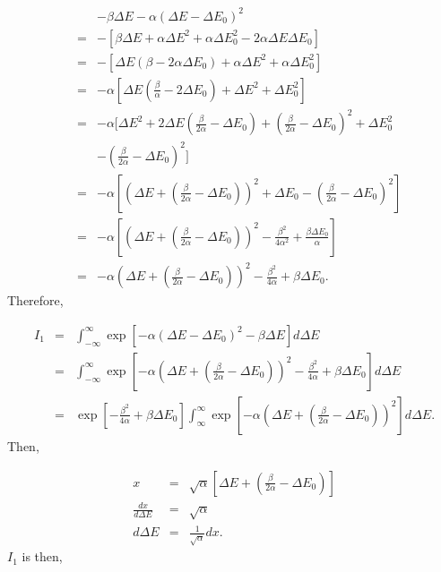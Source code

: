 \begin{eqnarray}
\ & & -\beta \Delta E- \alpha(\Delta E- \Delta E_0)^2 \\
\ &=& - \left[ \beta \Delta E + \alpha  \Delta E^2 + \alpha \Delta E^2_0 - 2 \alpha\Delta E\Delta E_0 \right] \\
\ &=& - \left[\Delta E \left( \beta -  2\alpha\Delta E_0 \right) + \alpha \Delta E^2 + \alpha \Delta E^2_0 \right] \\
\ &=& - \alpha \left[ \Delta E \left( \frac{\beta}{\alpha} -  2 \Delta E_0 \right)+ \Delta E^2 +  \Delta E^2_0  \right] \\
\ &=& - \alpha [ \Delta E^2 + 2\Delta E \left( \frac{\beta}{2\alpha} -  \Delta E_0 \right)+ \left( \frac{\beta}{2\alpha} -  \Delta E_0 \right)^2 + \Delta E^2_0 \nonumber \\
& & - \left( \frac{\beta}{2\alpha} - \Delta E_0 \right)^2 ] \\
&=& - \alpha \left[ \left( \Delta E + \left(\frac{\beta}{2\alpha}- \Delta E_0 \right) \right)^2 + \Delta E_0 - \left( \frac{\beta}{2 \alpha}- \Delta E_0 \right)^2  \right] \\
\ &=& - \alpha \left[ \left( \Delta E + \left(\frac{\beta}{2\alpha}- \Delta E_0 \right) \right)^2 - \frac{\beta^2}{4\alpha^2} + \frac{\beta \Delta E_0}{\alpha} \right] \\
\ &=& - \alpha \left( \Delta E + \left(\frac{\beta}{2\alpha}- \Delta E_0 \right) \right)^2 - \frac{\beta^2}{4\alpha} + \beta \Delta E_0 .
\end{eqnarray}
%
Therefore,

\begin{eqnarray}
\ I_1 &=& \int_{-\infty}^{\infty} \exp \left[ - \alpha (\Delta E-\Delta E_0)^2 - \beta \Delta E  \right] d \Delta E \\
\ &=& \int_{-\infty}^{\infty} \exp \left[ -\alpha \left(\Delta E + \left(\frac{\beta}{2\alpha}- \Delta E_0 \right) \right)^2 - \frac{\beta^2}{4\alpha} + \beta \Delta E_0 \right] d \Delta E \\
\ &=& \exp \left[ - \frac{\beta^2}{4\alpha} + \beta \Delta E_0 \right] \int_{\infty}^{\infty} \exp \left[ - \alpha \left( \Delta E + \left( \frac{\beta}{2\alpha}- \Delta E_0\right)\right)^2 \right] d \Delta E .
\end{eqnarray}
%
Then,

\begin{eqnarray}
\ x &=& \sqrt{\alpha}\left[ \Delta E+\left( \frac{\beta}{2 \alpha}- \Delta E_0 \right)\right] \\
\ \frac{dx}{d\Delta E} &=& \sqrt{\alpha} \\
\ d\Delta E &=& \frac{1}{\sqrt{\alpha}} dx .
\end{eqnarray}
%
$I_1$ is then,

